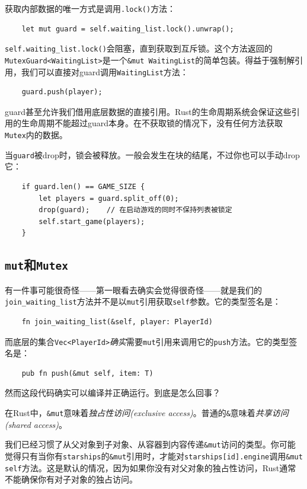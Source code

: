 获取内部数据的唯一方式是调用\texttt{.lock()}方法：
\begin{verbatim}
    let mut guard = self.waiting_list.lock().unwrap();
\end{verbatim}

\texttt{self.waiting\_list.lock()}会阻塞，直到获取到互斥锁。这个方法返回的\texttt{MutexGuard<WaitingList>}是一个\texttt{\&mut WaitingList}的简单包装。得益于强制解引用，我们可以直接对guard调用\texttt{WaitingList}方法：
\begin{verbatim}
    guard.push(player);
\end{verbatim}

guard甚至允许我们借用底层数据的直接引用。Rust的生命周期系统会保证这些引用的生命周期不能超过guard本身。在不获取锁的情况下，没有任何方法获取\texttt{Mutex}内的数据。

当\texttt{guard}被drop时，锁会被释放。一般会发生在块的结尾，不过你也可以手动drop它：
\begin{verbatim}
    if guard.len() == GAME_SIZE {
        let players = guard.split_off(0);
        drop(guard);    // 在启动游戏的同时不保持列表被锁定
        self.start_game(players);
    }
\end{verbatim}

\subsection{\texttt{mut}和\texttt{Mutex}}
有一件事可能很奇怪——第一眼看去确实会觉得很奇怪——就是我们的\texttt{join\_waiting\_list}方法并不是以\texttt{mut}引用获取\texttt{self}参数。它的类型签名是：
\begin{verbatim}
    fn join_waiting_list(&self, player: PlayerId)
\end{verbatim}

而底层的集合\texttt{Vec<PlayerId>}\emph{确实}需要\texttt{mut}引用来调用它的\texttt{push}方法。它的类型签名是：
\begin{verbatim}
    pub fn push(&mut self, item: T)
\end{verbatim}

然而这段代码确实可以编译并正确运行。到底是怎么回事？

在Rust中，\texttt{\&mut}意味着\emph{独占性访问(exclusive access)}。普通的\texttt{\&}意味着\emph{共享访问(shared access)}。

我们已经习惯了从父对象到子对象、从容器到内容传递\texttt{\&mut}访问的类型。你可能觉得只有当你有\texttt{starships}的\texttt{\&mut}引用时，才能对\texttt{starships[id].engine}调用\texttt{\&mut self}方法。这是默认的情况，因为如果你没有对父对象的独占性访问，Rust通常不能确保你有对子对象的独占访问。

